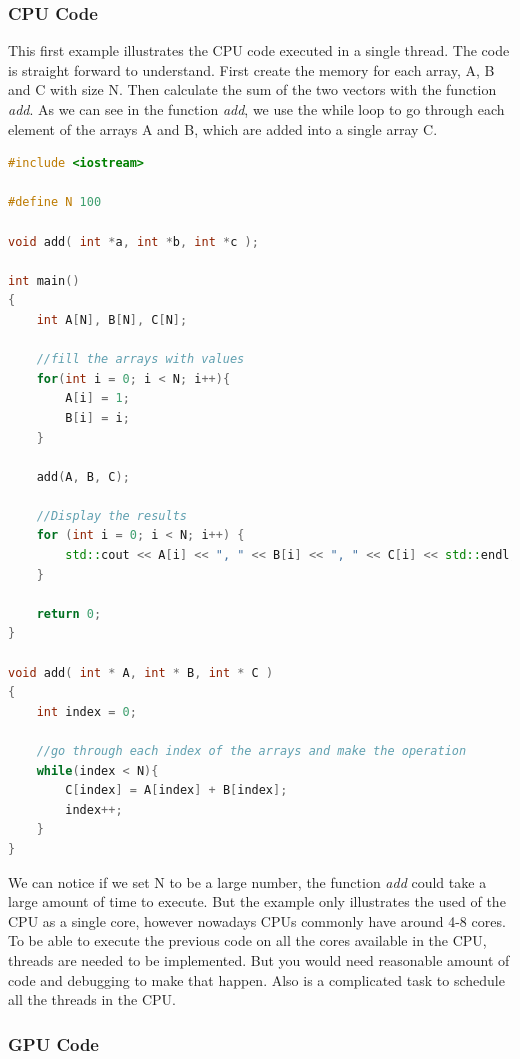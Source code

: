 \subsubsection{CPU Code}

This first example illustrates the CPU code executed in a single thread. The code is straight forward to understand. First create the memory for each array, A, B and C with size N. Then calculate the sum of the two vectors with the function \textit{add}. As we can see in the function \textit{add}, we use the while loop to go through each element of the arrays A and B, which are added into a single array C.

\begin{lstlisting}[language=C++, caption={CPU Vector Addition}]
#include <iostream>

#define N 100

void add( int *a, int *b, int *c );

int main()
{
    int A[N], B[N], C[N];
    
    //fill the arrays with values
    for(int i = 0; i < N; i++){
        A[i] = 1;
        B[i] = i;
    }
    
    add(A, B, C);
    
    //Display the results
    for (int i = 0; i < N; i++) {
        std::cout << A[i] << ", " << B[i] << ", " << C[i] << std::endl;
    }
    
    return 0;
}

void add( int * A, int * B, int * C )
{
    int index = 0;
    
    //go through each index of the arrays and make the operation
    while(index < N){
        C[index] = A[index] + B[index];
        index++;
    }
}

\end{lstlisting}

We can notice if we set N to be a large number, the function \textit{add} could take a large amount of time to execute. But the example only illustrates the used of the CPU as a single core, however nowadays CPUs commonly have around 4-8 cores. To be able to execute the previous code on all the cores available in the CPU, threads are needed to be implemented. But you would need reasonable amount of code and debugging to make that happen. Also is a complicated task to schedule all the threads in the CPU. 

\subsubsection{GPU Code}

